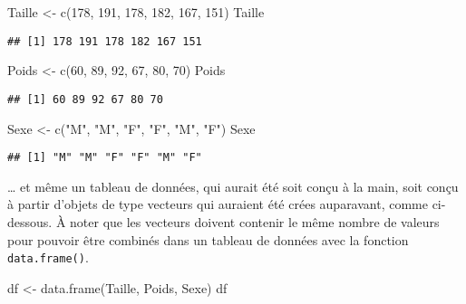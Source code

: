 \documentclass[
]{book}
\newenvironment{Shaded}{\begin{snugshade}}{\end{snugshade}}
\newcommand{\DecValTok}[1]{\textcolor[rgb]{0.00,0.00,0.81}{#1}}
\newcommand{\FunctionTok}[1]{\textcolor[rgb]{0.00,0.00,0.00}{#1}}
\newcommand{\NormalTok}[1]{#1}
\newcommand{\OtherTok}[1]{\textcolor[rgb]{0.56,0.35,0.01}{#1}}
\newcommand{\StringTok}[1]{\textcolor[rgb]{0.31,0.60,0.02}{#1}}
\begin{document}
\begin{Shaded}
\begin{Highlighting}[]
\NormalTok{Taille }\OtherTok{\textless{}{-}} \FunctionTok{c}\NormalTok{(}\DecValTok{178}\NormalTok{, }\DecValTok{191}\NormalTok{, }\DecValTok{178}\NormalTok{, }\DecValTok{182}\NormalTok{, }\DecValTok{167}\NormalTok{, }\DecValTok{151}\NormalTok{)}
\NormalTok{Taille}
\end{Highlighting}
\end{Shaded}

\begin{verbatim}
## [1] 178 191 178 182 167 151
\end{verbatim}

\begin{Shaded}
\begin{Highlighting}[]
\NormalTok{Poids }\OtherTok{\textless{}{-}} \FunctionTok{c}\NormalTok{(}\DecValTok{60}\NormalTok{, }\DecValTok{89}\NormalTok{, }\DecValTok{92}\NormalTok{, }\DecValTok{67}\NormalTok{, }\DecValTok{80}\NormalTok{, }\DecValTok{70}\NormalTok{)}
\NormalTok{Poids}
\end{Highlighting}
\end{Shaded}

\begin{verbatim}
## [1] 60 89 92 67 80 70
\end{verbatim}

\begin{Shaded}
\begin{Highlighting}[]
\NormalTok{Sexe }\OtherTok{\textless{}{-}} \FunctionTok{c}\NormalTok{(}\StringTok{"M"}\NormalTok{, }\StringTok{"M"}\NormalTok{, }\StringTok{"F"}\NormalTok{, }\StringTok{"F"}\NormalTok{, }\StringTok{"M"}\NormalTok{, }\StringTok{"F"}\NormalTok{)}
\NormalTok{Sexe}
\end{Highlighting}
\end{Shaded}

\begin{verbatim}
## [1] "M" "M" "F" "F" "M" "F"
\end{verbatim}

\ldots{} et même un tableau de données, qui aurait été soit conçu à la main, soit conçu à partir d'objets de type vecteurs qui auraient été crées auparavant, comme ci-dessous. À noter que les vecteurs doivent contenir le même nombre de valeurs pour pouvoir être combinés dans un tableau de données avec la fonction \texttt{data.frame()}.

\begin{Shaded}
\begin{Highlighting}[]
\NormalTok{df }\OtherTok{\textless{}{-}} \FunctionTok{data.frame}\NormalTok{(Taille, Poids, Sexe)}
\NormalTok{df}
\end{Highlighting}
\end{Shaded}
\end{document}
